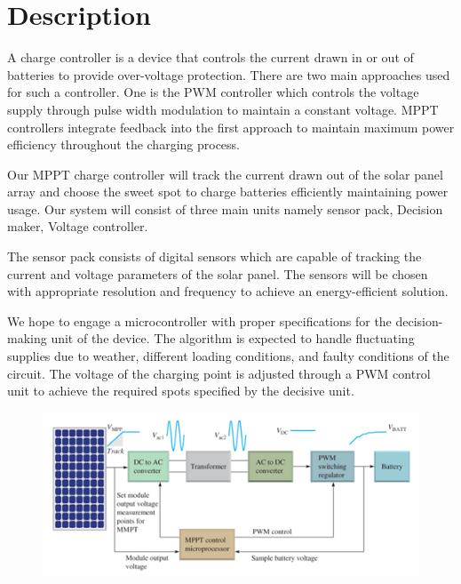 \documentclass[12pt]{article}
\begin{document}
\section*{Description}
A charge controller is a device that controls the current drawn in or out of batteries to provide over-voltage protection.
There are two main approaches used for such a controller. One is the PWM controller which controls the voltage supply through pulse width modulation to maintain a constant voltage. MPPT controllers integrate feedback into the first approach to maintain maximum power efficiency throughout the charging process.
\par
Our MPPT charge controller will track the current drawn out of the solar panel array and choose the sweet spot to charge batteries efficiently maintaining power usage. Our system will consist of three main units namely sensor pack, Decision maker, Voltage controller.
\par
The sensor pack consists of digital sensors which are capable of tracking the current and voltage parameters of the solar panel.
The sensors will be chosen with appropriate resolution and frequency to achieve an energy-efficient solution.
\par
We hope to engage a microcontroller with proper specifications for the decision-making unit of the device. The algorithm is expected to handle fluctuating supplies due to weather, different loading conditions, and faulty conditions of the circuit. The voltage of the charging point is adjusted through a PWM control unit to achieve the required spots specified by the decisive unit.
\begin{figure}[h]
    \begin{center}
        \includegraphics[width=.6\textwidth]{main.png}
    \end{center}
\end{figure}
\end{document}
